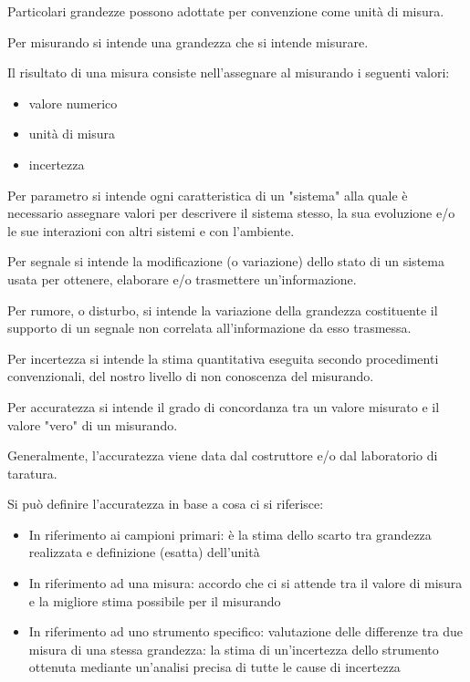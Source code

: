 Particolari grandezze possono adottate per convenzione come unità di misura. \newline 

Per misurando si intende una grandezza che si intende misurare. \newline 

Il risultato di una misura consiste nell'assegnare al misurando i seguenti valori: 

\begin{itemize}
    \item valore numerico 
    \item unità di misura 
    \item incertezza 
\end{itemize}

Per parametro si intende ogni caratteristica di un "sistema" alla quale è necessario assegnare valori 
per descrivere il sistema stesso, la sua evoluzione e/o le sue interazioni con altri sistemi e con l'ambiente. \newline 

Per segnale si intende la modificazione (o variazione) dello stato di un sistema usata per ottenere, elaborare e/o trasmettere un'informazione. \newline 

Per rumore, o disturbo, si intende la variazione della grandezza costituente il supporto di un segnale non correlata all'informazione da esso trasmessa. \newline 

Per incertezza si intende la stima quantitativa eseguita secondo procedimenti convenzionali, del nostro livello di non conoscenza del misurando. \newline 

Per accuratezza si intende il grado di concordanza tra un valore misurato e il valore "vero" di un misurando. \newline 

Generalmente, l'accuratezza viene data dal costruttore e/o dal laboratorio di taratura. \newline 

Si può definire l'accuratezza in base a cosa ci si riferisce: 

\begin{itemize}
    \item In riferimento ai campioni primari: è la stima dello scarto tra grandezza realizzata e definizione (esatta) dell'unità 
    \item In riferimento ad una misura: accordo che ci si attende tra il valore di misura e la migliore stima possibile per il misurando 
    \item In riferimento ad uno strumento specifico: valutazione delle differenze tra due misura di una stessa grandezza: la stima di un'incertezza dello strumento ottenuta mediante un'analisi precisa di tutte le cause di incertezza
\end{itemize}

